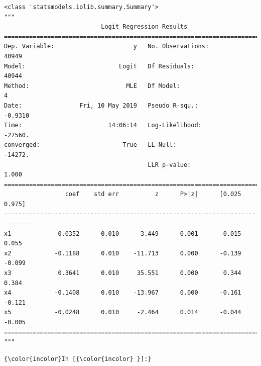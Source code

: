 \documentclass[8pt,onecolumn,aps,pra]{revtex4-1}
\begin{document}
    
    \begin{verbatim}
<class 'statsmodels.iolib.summary.Summary'>
"""
                           Logit Regression Results                           
==============================================================================
Dep. Variable:                      y   No. Observations:                40949
Model:                          Logit   Df Residuals:                    40944
Method:                           MLE   Df Model:                            4
Date:                Fri, 10 May 2019   Pseudo R-squ.:                 -0.9310
Time:                        14:06:14   Log-Likelihood:                -27560.
converged:                       True   LL-Null:                       -14272.
                                        LLR p-value:                     1.000
==============================================================================
                 coef    std err          z      P>|z|      [0.025      0.975]
------------------------------------------------------------------------------
x1             0.0352      0.010      3.449      0.001       0.015       0.055
x2            -0.1188      0.010    -11.713      0.000      -0.139      -0.099
x3             0.3641      0.010     35.551      0.000       0.344       0.384
x4            -0.1408      0.010    -13.967      0.000      -0.161      -0.121
x5            -0.0248      0.010     -2.464      0.014      -0.044      -0.005
==============================================================================
"""
    \end{verbatim}

    \begin{Verbatim}[commandchars=\\\{\}]
{\color{incolor}In [{\color{incolor} }]:} 
\end{Verbatim}
\end{document}
